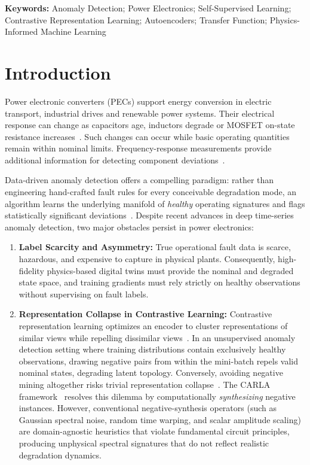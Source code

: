 \documentclass[11pt,a4paper]{article}
\begin{document}
\noindent\textbf{Keywords:} Anomaly Detection; Power Electronics; Self-Supervised Learning; Contrastive Representation Learning; Autoencoders; Transfer Function; Physics-Informed Machine Learning

\section{Introduction}
\label{sec:intro}

Power electronic converters (PECs) support energy conversion in electric transport, industrial drives and renewable power systems. Their electrical response can change as capacitors age, inductors degrade or MOSFET on-state resistance increases~\cite{celaya2011mosfet,kulkarni2010electrolytic,dang2020capacitors}. Such changes can occur while basic operating quantities remain within nominal limits. Frequency-response measurements provide additional information for detecting component deviations~\cite{liu2023review,kou2023faultdiagnosis}.

Data-driven anomaly detection offers a compelling paradigm: rather than engineering hand-crafted fault rules for every conceivable degradation mode, an algorithm learns the underlying manifold of \emph{healthy} operating signatures and flags statistically significant deviations~\cite{beattie2022robust,gomez2024selfcommissioning}. Despite recent advances in deep time-series anomaly detection, two major obstacles persist in power electronics:
\begin{enumerate}
    \item \textbf{Label Scarcity and Asymmetry:} True operational fault data is scarce, hazardous, and expensive to capture in physical plants. Consequently, high-fidelity physics-based digital twins must provide the nominal and degraded state space, and training gradients must rely strictly on healthy observations without supervising on fault labels.
    \item \textbf{Representation Collapse in Contrastive Learning:} Contrastive representation learning optimizes an encoder to cluster representations of similar views while repelling dissimilar views~\cite{chen2020simclr}. In an unsupervised anomaly detection setting where training distributions contain exclusively healthy observations, drawing negative pairs from within the mini-batch repels valid nominal states, degrading latent topology. Conversely, avoiding negative mining altogether risks trivial representation collapse~\cite{chen2023harnessing,zhang2025encodethendecompose}. The CARLA framework~\cite{darban2025carla} resolves this dilemma by computationally \emph{synthesizing} negative instances. However, conventional negative-synthesis operators (such as Gaussian spectral noise, random time warping, and scalar amplitude scaling) are domain-agnostic heuristics that violate fundamental circuit principles, producing unphysical spectral signatures that do not reflect realistic degradation dynamics.
\end{enumerate}
\end{document}
